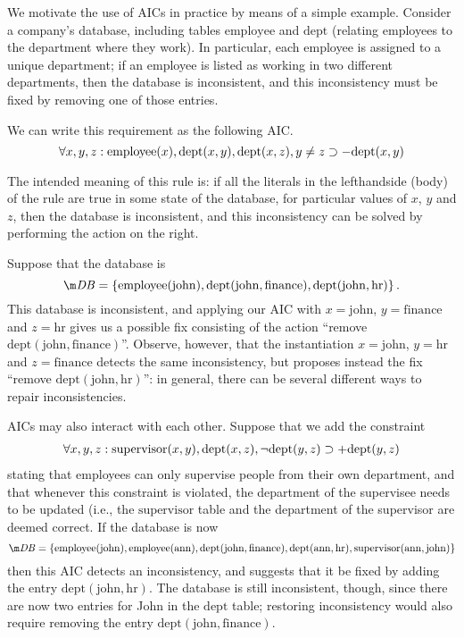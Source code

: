 \begin{example}\label{ex:intro}
  We motivate the use of AICs in practice by means of a simple example.
  Consider a company's database, including tables $\mathrm{employee}$ and $\mathrm{dept}$ (relating employees to the department where they work).
  In particular, each employee is assigned to a unique department; if an employee is listed as working in two different departments, then the database is inconsistent, and this inconsistency must be fixed by removing one of those entries.

  We can write this requirement as the following AIC.
  \[
  \forall x, y, z: \mathrm{employee}(x),\mathrm{dept}(x,y),\mathrm{dept}(x,z),y\neq z \supset -\mathrm{dept}(x,y)
  \]

  The intended meaning of this rule is: if all the literals in the lefthandside (body) of the rule are true in some state of the database, for particular values of $x$, $y$ and $z$, then the database is inconsistent, and this inconsistency can be solved by performing the action on the right.

  Suppose that the database is
  \[\db=\{\mathrm{employee}(\mathrm{john}),\mathrm{dept}(\mathrm{john},\mathrm{finance}),\mathrm{dept}(\mathrm{john},\mathrm{hr})\}\,.\]
  This database is inconsistent, and applying our AIC with $x=\mathrm{john}$, $y=\mathrm{finance}$ and $z=\mathrm{hr}$ gives us a possible fix consisting of the action ``remove $\mathrm{dept}(\mathrm{john},\mathrm{finance})$''.
  Observe, however, that the instantiation $x=\mathrm{john}$, $y=\mathrm{hr}$ and $z=\mathrm{finance}$ detects the same inconsistency, but proposes instead the fix ``remove $\mathrm{dept}(\mathrm{john},\mathrm{hr})$'': in general, there can be several different ways to repair inconsistencies.

  AICs may also interact with each other.
  Suppose that we add the constraint
  \begin{align} \forall x, y, z: \mathrm{supervisor}(x,y),\mathrm{dept}(x,z),\neg\mathrm{dept}(y,z)\supset +\mathrm{dept}(y,z)\label{rule:dept}\end{align}
  stating that employees can only supervise people from their own department, and that whenever this constraint is violated, the department of the supervisee needs to be updated (i.e., the  $\mathrm{supervisor}$ table and the department of the supervisor are deemed correct. 
  If the database is now
  \[
    \db=\{\mathrm{employee}(\mathrm{john}),\mathrm{employee}(\mathrm{ann}),
    \mathrm{dept}(\mathrm{john},\mathrm{finance}),\mathrm{dept}(\mathrm{ann},\mathrm{hr}),
    \mathrm{supervisor}(\mathrm{ann},\mathrm{john})\}
  \]
  then this AIC detects an inconsistency, and suggests that it be fixed by adding the entry $\mathrm{dept}(\mathrm{john},\mathrm{hr})$.
  The database is still inconsistent, though, since there are now two entries for John in the $\mathrm{dept}$ table; restoring inconsistency would also require removing the entry $\mathrm{dept}(\mathrm{john},\mathrm{finance})$.


\end{example}
